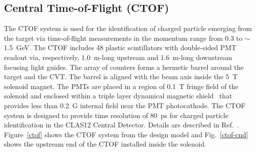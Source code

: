 \documentclass[final,3p,twocolumn]{elsarticle}
\begin{document}
\subsection{Central Time-of-Flight (CTOF)}

The CTOF system is used for the identification of charged particle emerging from the target via time-of-flight
measurements in the momentum range from 0.3 to $\sim$1.5~GeV. The CTOF includes 48 plastic scintillators with
double-sided PMT readout via, respectively, 1.0~m-long upstream and 1.6~m-long downstream focusing light guides.
The array of counters forms a hermetic barrel around the target and the CVT. The barrel is aligned with the beam
axis inside the 5~T solenoid magnet. The PMTs are placed in a region of 0.1~T fringe field of the solenoid and
enclosed within a triple layer dynamical magnetic shield~\cite{Baturin:2012zz} that provides less than 0.2~G
internal field near the PMT photocathode. The CTOF system is designed to provide time resolution of 80~ps for
charged particle identification in the CLAS12 Central Detector. Details are described in Ref.~\cite{ctof-nim}.
Figure~\ref{ctof} shows the CTOF system from the design model and Fig.~\ref{ctof-cnd} shows the upstream
end of the CTOF installed inside the solenoid.
\end{document}

